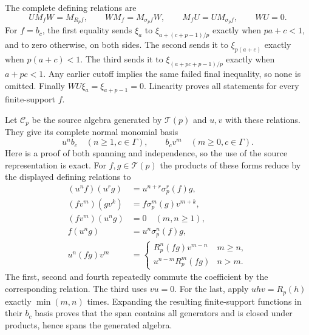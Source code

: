 The complete defining relations are
\begin{equation}\tag{CFP33}
 UM_fW=M_{R_pf},\qquad
 WM_f=M_{\sigma_pf}W,\qquad
 M_fU=UM_{\sigma_pf},\qquad WU=0.
\end{equation}
For $f=b_c$, the first equality sends $\xi_a$
to $\xi_{a+(c+p-1)/p}$ exactly when
$pa+c<1$, and to zero otherwise, on both
sides. The second sends it to $\xi_{p(a+c)}$
exactly when $p(a+c)<1$. The third sends
it to $\xi_{(a+pc+p-1)/p}$ exactly when
$a+pc<1$. Any earlier cutoff implies the
same failed final inequality, so none is
omitted. Finally $WU\xi_a=\xi_{a+p-1}=0$.
Linearity proves all statements for every
finite-support $f$.

Let $\mathcal C_p$ be the source algebra generated
by $\mathcal T(p)$ and $u,v$ with these relations.
They give its complete normal monomial basis
\begin{equation}\tag{CFP34}
 u^n b_c\quad(n\ge1,c\in\Gamma),\qquad
 b_cv^m\quad(m\ge0,c\in\Gamma).
\end{equation}
Here is a proof of both spanning and independence,
so the use of the source representation is exact.
For $f,g\in\mathcal T(p)$ the products of these
forms reduce by the displayed defining relations to
\begin{equation}\tag{CFP35}
\begin{aligned}
 (u^nf)(u^rg)&=u^{n+r}\sigma_p^r(f)g,\\
 (fv^m)(gv^k)&=f\sigma_p^m(g)v^{m+k},\\
 (fv^m)(u^ng)&=0\quad(m,n\ge1),\\
 f(u^ng)&=u^n\sigma_p^n(f)g,\\
 u^n(fg)v^m&=
 \begin{cases}R_p^n(fg)v^{m-n}&m\ge n,\\
 u^{n-m}R_p^m(fg)&n>m.
 \end{cases}
\end{aligned}
\end{equation}
The first, second and fourth repeatedly commute
the coefficient by the corresponding relation.
The third uses $vu=0$. For the last, apply
$u h v=R_p(h)$ exactly $\min(m,n)$ times.
Expanding the resulting finite-support functions
in their $b_c$ basis proves that the span
contains all generators and is closed under
products, hence spans the generated algebra.

